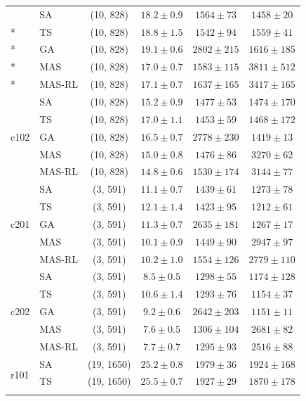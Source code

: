 {\begin{longtable}{llcccc}
\bottomrule
\endlastfoot
\multirow{5}{*}{c101} & SA & (10, 828) & $18.2 \pm 0.9$ & $1564 \pm 73$ & $1458 \pm 20$ \\*
 & TS & (10, 828) & $18.8 \pm 1.5$ & $1542 \pm 94$ & $1559 \pm 41$ \\*
 & GA & (10, 828) & $19.1 \pm 0.6$ & $2802 \pm 215$ & $1616 \pm 185$ \\*
 & MAS & (10, 828) & $17.0 \pm 0.7$ & $1583 \pm 115$ & $3811 \pm 512$ \\*
 & MAS-RL & (10, 828) & $17.1 \pm 0.7$ & $1637 \pm 165$ & $3417 \pm 165$ \\
\midrule
\multirow{5}{*}{c102} & SA & (10, 828) & $15.2 \pm 0.9$ & $1477 \pm 53$ & $1474 \pm 170$ \\*
 & TS & (10, 828) & $17.0 \pm 1.1$ & $1453 \pm 59$ & $1468 \pm 172$ \\*
 & GA & (10, 828) & $16.5 \pm 0.7$ & $2778 \pm 230$ & $1419 \pm 13$ \\*
 & MAS & (10, 828) & $15.0 \pm 0.8$ & $1476 \pm 86$ & $3270 \pm 62$ \\*
 & MAS-RL & (10, 828) & $14.8 \pm 0.6$ & $1530 \pm 174$ & $3144 \pm 77$ \\
\midrule
\multirow{5}{*}{c201} & SA & (3, 591) & $11.1 \pm 0.7$ & $1439 \pm 61$ & $1273 \pm 78$ \\*
 & TS & (3, 591) & $12.1 \pm 1.4$ & $1423 \pm 95$ & $1212 \pm 61$ \\*
 & GA & (3, 591) & $11.3 \pm 0.7$ & $2635 \pm 181$ & $1267 \pm 17$ \\*
 & MAS & (3, 591) & $10.1 \pm 0.9$ & $1449 \pm 90$ & $2947 \pm 97$ \\*
 & MAS-RL & (3, 591) & $10.2 \pm 1.0$ & $1554 \pm 126$ & $2779 \pm 110$ \\
\midrule
\multirow{5}{*}{c202} & SA & (3, 591) & $8.5 \pm 0.5$ & $1298 \pm 55$ & $1174 \pm 128$ \\*
 & TS & (3, 591) & $10.6 \pm 1.4$ & $1293 \pm 76$ & $1154 \pm 37$ \\*
 & GA & (3, 591) & $9.2 \pm 0.6$ & $2642 \pm 203$ & $1151 \pm 11$ \\*
 & MAS & (3, 591) & $7.6 \pm 0.5$ & $1306 \pm 104$ & $2681 \pm 82$ \\*
 & MAS-RL & (3, 591) & $7.7 \pm 0.7$ & $1295 \pm 93$ & $2516 \pm 88$ \\
\midrule
\multirow{5}{*}{r101} & SA & (19, 1650) & $25.2 \pm 0.8$ & $1979 \pm 36$ & $1924 \pm 168$ \\*
 & TS & (19, 1650) & $25.5 \pm 0.7$ & $1927 \pm 29$ & $1870 \pm 178$ \\*

\end{longtable}}

